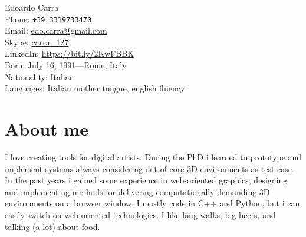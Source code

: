 \documentclass[10pt, a4paper]{article} %
\begin{document}


{\LARGE Edoardo Carra}\\ %

Phone: \texttt{+39 3319733470}\\ %
Email: \href{mailto:edo.carra@gmail.com}{edo.carra@gmail.com}\\ %
Skype: \href{https://join.skype.com/invite/gQN9qtZGLZ7r}{carra\_127}\\
LinkedIn: \href{https://www.linkedin.com/in/edoardocarra/}{https://bit.ly/2KwFBBK}\\ %


Born: July 16, 1991---Rome, Italy\\ %
Nationality: Italian\\ %
Languages: Italian mother tongue, english fluency

\section*{About me}

I love creating tools for digital artists. During the PhD i learned to prototype and implement systems always considering out-of-core 3D environments as test case. In the past years i gained some experience in web-oriented graphics, designing and implementing methods for delivering computationally demanding 3D environments on a browser window. I mostly code in C++ and Python, but i can easily switch on web-oriented technologies. I like long walks, big beers, and talking (a lot) about food.

\end{document}
